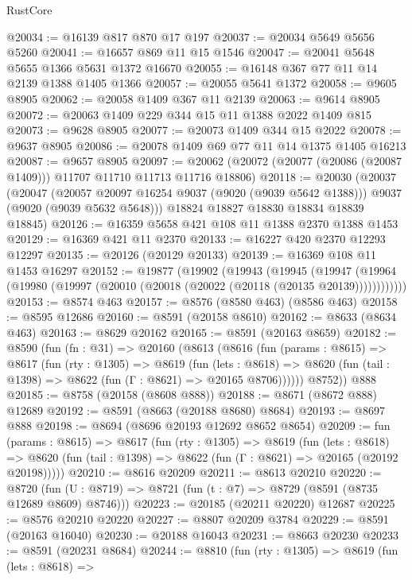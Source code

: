 \begin{lexlean}{RustCore}
\begin{coremodule}
@20034 := @16139 @817 @870 @17 @197
@20037 := @20034 @5649 @5656 @5260
@20041 := @16657 @869 @11 @15 @1546
@20047 := @20041 @5648 @5655 @1366 @5631 @1372 @16670
@20055 := @16148 @367 @77 @11 @14 @2139 @1388 @1405 @1366
@20057 := @20055 @5641 @1372
@20058 := @9605 @8905
@20062 := @20058 @1409 @367 @11 @2139
@20063 := @9614 @8905
@20072 := @20063 @1409 @229 @344 @15 @11 @1388 @2022 @1409 @815
@20073 := @9628 @8905
@20077 := @20073 @1409 @344 @15 @2022
@20078 := @9637 @8905
@20086 := @20078 @1409 @69 @77 @11 @14 @1375 @1405 @16213
@20087 := @9657 @8905
@20097 := @20062 (@20072 (@20077 (@20086 (@20087 @1409))) @11707 @11710 @11713 @11716 @18806)
@20118 := @20030
    (@20037
      (@20047
        (@20057 @20097 @16254 @9037 (@9020 (@9039 @5642 @1388)))
        @9037
        (@9020 (@9039 @5632 @5648)))
      @18824
      @18827
      @18830
      @18834
      @18839
      @18845)
@20126 := @16359 @5658 @421 @108 @11 @1388 @2370 @1388 @1453
@20129 := @16369 @421 @11 @2370
@20133 := @16227 @420 @2370 @12293 @12297
@20135 := @20126 (@20129 @20133)
@20139 := @16369 @108 @11 @1453 @16297
@20152 := @19877
    (@19902
      (@19943
        (@19945
          (@19947 (@19964 (@19980 (@19997 (@20010 (@20018 (@20022 (@20118 (@20135 @20139))))))))))))
@20153 := @8574 @463
@20157 := @8576 (@8580 @463) (@8586 @463)
@20158 := @8595 @12686
@20160 := @8591 (@20158 @8610)
@20162 := @8633 (@8634 @463)
@20163 := @8629 @20162
@20165 := @8591 (@20163 @8659)
@20182 := @8590
    (fun (fn : @31) =>
    @20160
      (@8613
        (@8616
          (fun (params : @8615) =>
          @8617
            (fun (rty : @1305) =>
            @8619
              (fun (lets : @8618) =>
              @8620 (fun (tail : @1398) => @8622 (fun (Γ : @8621) => @20165 @8706))))))
        @8752))
    @888
@20185 := @8758 (@20158 (@8608 @888))
@20188 := @8671 (@8672 @888) @12689
@20192 := @8591 (@8663 (@20188 @8680) @8684)
@20193 := @8697 @888
@20198 := @8694 (@8696 @20193 @12692 @8652 @8654)
@20209 := fun (params : @8615) =>
  @8617
    (fun (rty : @1305) =>
    @8619
      (fun (lets : @8618) =>
      @8620 (fun (tail : @1398) => @8622 (fun (Γ : @8621) => @20165 (@20192 @20198)))))
@20210 := @8616 @20209
@20211 := @8613 @20210
@20220 := @8720
    (fun (U : @8719) => @8721 (fun (t : @7) => @8729 (@8591 (@8735 @12689 @8609) @8746)))
@20223 := @20185 (@20211 @20220) @12687
@20225 := @8576 @20210 @20220
@20227 := @8807 @20209 @3784
@20229 := @8591 (@20163 @16040)
@20230 := @20188 @16043
@20231 := @8663 @20230
@20233 := @8591 (@20231 @8684)
@20244 := @8810
    (fun (rty : @1305) =>
    @8619
      (fun (lets : @8618) =>

\end{coremodule}
\end{lexlean}
